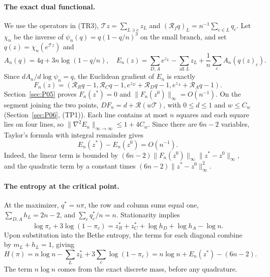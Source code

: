 \paragraph{The exact dual functional.}
We use the operators in (TR3), $\mathcal Tz=\sum_{L\ni c}z_L$ and
$(\mathcal R_fq)_L=n^{-1}\sum_{c\in L}q_c$.
Let $\chi_n$ be the inverse of $\psi_n(q)=q(1-q/n)^3$ on the small branch, and set
$q(z)=\chi_n(e^{\mathcal Tz})$ and
\[
 A_n(q)=4q+3n\log(1-q/n),
 \quad E_n(z)=\sum_{D,A}e^{z_L}-\sum_{\text{all }L}z_L
                         +\frac1n\sum_c A_n(q(z)_c).       \tag{D1.2}
\]
Since $dA_n/d\log\psi_n=q$, the Euclidean gradient of $E_n$ is exactly
\[
 F_n(z)=(\mathcal R_Rq-1,\mathcal R_Cq-1,
                 e^{z_D}+\mathcal R_Dq-1,e^{z_A}+\mathcal R_Aq-1).
\]
Section~\ref{sec:P05} proves $F_n(z^*)=0$ and
$\|F_n(z^0)\|_\infty=O(n^{-1})$. On the segment joining the two points,
$DF_n=d+\mathcal R(w\mathcal T)$, with $0\le d\le1$ and
$w\le C_w$ (Section~\ref{sec:P06}, (TP1)). Each line contains at most $n$ squares
and each square lies on four lines, so
$\|\nabla^2E_n\|_{\infty\to\infty}\le1+4C_w$.
Since there are $6n-2$ variables, Taylor's formula with integral remainder gives
\[
 E_n(z^*)-E_n(z^0)=O(n^{-1}).                         \tag{D1.3}
\]
Indeed, the linear term is bounded by
$(6n-2)\|F_n(z^0)\|_\infty\|z^*-z^0\|_\infty$,
and the quadratic term by a constant times
$(6n-2)\|z^*-z^0\|_\infty^2$.

\paragraph{The entropy at the critical point.}
At the maximizer, $q^*=n\pi$, the row and column sums equal one,
$\sum_{D,A}h_L=2n-2$, and $\sum_c q_c^*/n=n$.
Stationarity implies
\[
 \log\pi_c+3\log(1-\pi_c)
       =z^*_{R}+z^*_{C}+\log h_D+\log h_A-\log n.
\]
Upon substitution into the Bethe entropy, the terms for each diagonal
combine by $m_L+h_L=1$, giving
\[
 H(\pi)=n\log n-\sum_Lz_L^*+3\sum_c\log(1-\pi_c)
       =n\log n+E_n(z^*)-(6n-2).                    \tag{D1.4}
\]
The term $n\log n$ comes from the exact discrete mass, before any quadrature.
